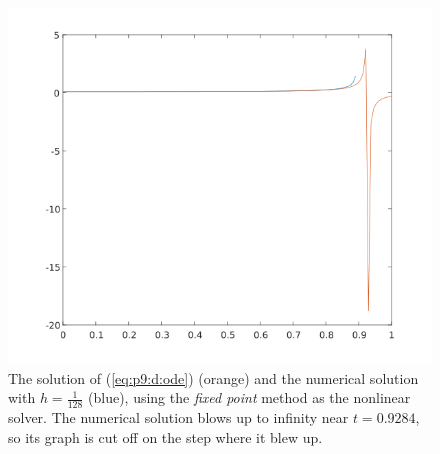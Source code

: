 \documentclass{homework}
\begin{document}
\begin{alphaparts}
			\begin{figure}[H]
				\centering
				\includegraphics[width=0.9\linewidth]{plot_p9d_fixed.png}
				\caption{The solution of (\ref{eq:p9:d:ode}) (orange) and the numerical solution with $h=\frac{1}{128}$ (blue), using the \textit{fixed point} method as the nonlinear solver. The numerical solution blows up to infinity near $t=0.9284$, so its graph is cut off on the step where it blew up.}
				\label{fig:p9d_fixed}
			\end{figure}
			
		\end{alphaparts}
\end{document}
